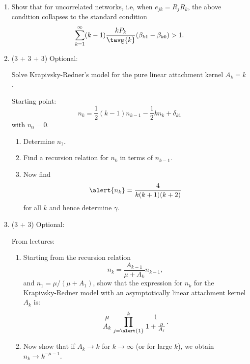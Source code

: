 \begin{enumerate}
  
   \solutionstart


   \solutionend


\item
  Show that for uncorrelated networks, i.e,
  when $e_{jk} = R_{j} R_{k}$, the above condition
  collapses to the standard condition
  $$
  \sum_{k=1}^{\infty} (k-1) \frac{k P_{k}}{\tavg{k}} (\beta_{k1} - \beta_{k0}) > 1.
  $$

  
   \solutionstart


   \solutionend



\item (3 + 3 + 3) Optional:

  Solve Krapivsky-Redner's model for the pure linear attachment
  kernel $A_{k}=k$. 

  Starting point:
  $$
  n_{k}
  =
  \frac{1}{2}
  (k-1) n_{k-1} 
  - 
  \frac{1}{2}
  k n_{k}
  + \delta_{k1}
  $$
  with $n_{0}=0$.

  \begin{enumerate}
  \item 
    Determine $n_{1}$.
  \item 
    Find a recursion relation for $n_{k}$ in terms
    of $n_{k-1}$.
  \item 
    Now find
    $$
    \alert{n_{k}} 
    = 
    \frac{4}{k(k+1)(k+2)}
    $$
    for all $k$ and
    hence determine $\gamma$.
  \end{enumerate}

  
   \solutionstart


   \solutionend

\item (3 + 3) Optional:

  From lectures:

  \begin{enumerate}
  \item 
    Starting from the recursion relation
    $$
    n_{k}
    =
    \frac{A_{k-1}}{\mu + A_{k}}
    n_{k-1},
    $$
    and $n_{1} = \mu/(\mu+A_{1})$,
    show that the expression for $n_{k}$ for
    the Krapivsky-Redner model with an asymptotically linear
    attachment kernel $A_{k}$ is:
    $$
    \frac{\mu}{A_{k}}
    \prod_{j=\alert{1}}^{k}
    \frac{1}{1 + \frac{\mu}{A_{j}}}.
    $$
  \item 
    Now show that if $A_{k} \rightarrow k$ for
    $k \rightarrow \infty$ (or for large $k$), we obtain
    $n_{k} \rightarrow k^{-\mu-1}$.
  \end{enumerate}


\end{enumerate}
